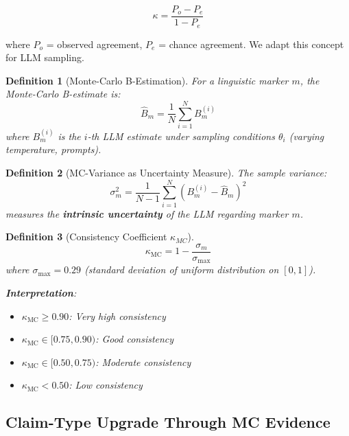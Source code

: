 \documentclass[11pt,a4paper]{article}
\newtheorem{definition}{Definition}[section]
\begin{document}
\[
\kappa = \frac{P_o - P_e}{1 - P_e}
\]

where $P_o$ = observed agreement, $P_e$ = chance agreement. We adapt this concept for LLM sampling.

\begin{definition}[Monte-Carlo B-Estimation]
\label{def:mc-b}
For a linguistic marker $m$, the Monte-Carlo B-estimate is:
\begin{equation}
\hat{B}_m = \frac{1}{N} \sum_{i=1}^{N} B_m^{(i)}
\end{equation}
where $B_m^{(i)}$ is the $i$-th LLM estimate under sampling conditions $\theta_i$ (varying temperature, prompts).
\end{definition}

\begin{definition}[MC-Variance as Uncertainty Measure]
\label{def:mc-var}
The sample variance:
\begin{equation}
\sigma^2_m = \frac{1}{N-1} \sum_{i=1}^{N} (B_m^{(i)} - \hat{B}_m)^2
\end{equation}
measures the \textbf{intrinsic uncertainty} of the LLM regarding marker $m$.
\end{definition}

\begin{definition}[Consistency Coefficient $\kappa_{MC}$]
\label{def:kappa-mc}
\begin{equation}
\kappa_{\text{MC}} = 1 - \frac{\sigma_m}{\sigma_{\max}}
\end{equation}
where $\sigma_{\max} = 0.29$ (standard deviation of uniform distribution on $[0,1]$).

\textbf{Interpretation}:
\begin{itemize}
    \item $\kappa_{\text{MC}} \geq 0.90$: Very high consistency
    \item $\kappa_{\text{MC}} \in [0.75, 0.90)$: Good consistency
    \item $\kappa_{\text{MC}} \in [0.50, 0.75)$: Moderate consistency
    \item $\kappa_{\text{MC}} < 0.50$: Low consistency
\end{itemize}
\end{definition}

\subsection{Claim-Type Upgrade Through MC Evidence}
\end{document}
